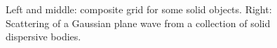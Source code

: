 {\begin{figure}[htb]
\begin{center}
{
}%
\end{center}
\caption{
  Left and middle: composite grid for some solid objects. 
  Right: Scattering of a Gaussian plane wave from a collection of solid dispersive bodies.
}
  \label{fig:solidObjects}
\end{figure}
}






